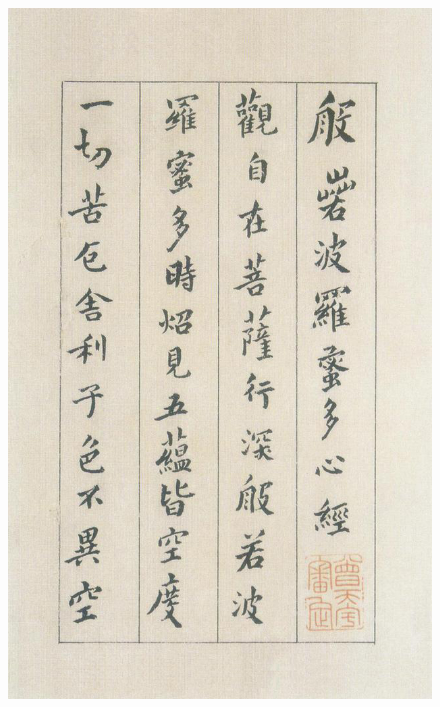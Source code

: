 \documentclass[a4paper,twoside]{article}
\begin{document}
\begin{figure}[ht]
\centering
\includegraphics[width=13.8cm]{images/fushan-1}
\end{figure}
\end{document}
